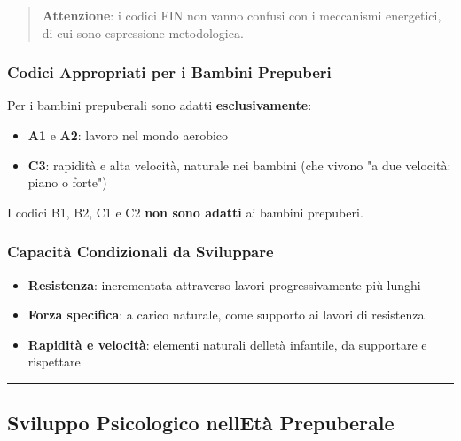 \documentclass[a4paper,11pt]{article}
\providecommand{\tightlist}{%
  \setlength{\itemsep}{0pt}\setlength{\parskip}{0pt}}
\begin{document}
\begin{quote}
      \textbf{Attenzione}: i codici FIN non vanno confusi con i meccanismi
      energetici, di cui sono espressione metodologica.
\end{quote}

\subsubsection{Codici Appropriati per i Bambini
      Prepuberi}\label{codici-appropriati-per-i-bambini-prepuberi}

Per i bambini prepuberali sono adatti \textbf{esclusivamente}:

\begin{itemize}
      \tightlist
      \item
            \textbf{A1} e \textbf{A2}: lavoro nel mondo aerobico
      \item
            \textbf{C3}: rapidità e alta velocità, naturale nei bambini (che
            vivono "a due velocità: piano o forte")
\end{itemize}

I codici B1, B2, C1 e C2 \textbf{non sono adatti} ai bambini prepuberi.

\subsubsection{Capacità Condizionali da
      Sviluppare}\label{capacituxe0-condizionali-da-sviluppare}

\begin{itemize}
      \tightlist
      \item
            \textbf{Resistenza}: incrementata attraverso lavori progressivamente
            più lunghi
      \item
            \textbf{Forza specifica}: a carico naturale, come supporto ai lavori
            di resistenza
      \item
            \textbf{Rapidità e velocità}: elementi naturali
            dell\textquotesingle età infantile, da supportare e rispettare
\end{itemize}

\begin{center}\rule{0.5\linewidth}{0.5pt}\end{center}

\subsection{Sviluppo Psicologico nell\textquotesingle Età
      Prepuberale}\label{sviluppo-psicologico-nelletuxe0-prepuberale}
\end{document}
